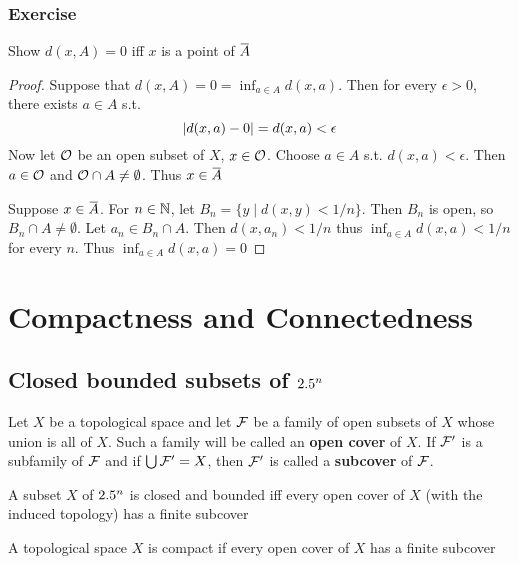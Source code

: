 \documentclass[11pt]{article}
\begin{document}
\subsubsection{Exercise}
\label{sec:org0058a10}
\begin{exercise}
\label{ex2.4.27}
Show \(d(x,A)=0\) iff \(x\) is a point of \(\bbar{A}\)
\end{exercise}

\begin{proof}
Suppose that \(d(x,A)=0=\inf_{a\in A}d(x,a)\). Then for every \(\epsilon>0\), there
exists \(a\in A\) s.t.
\begin{equation*}
\abs{d(x,a)-0}=d(x,a)<\epsilon
\end{equation*}
Now let \(\mathcal{O}\) be an open subset of \(X\), \(x\in\mathcal{O}\). Choose \(a\in
    A\) s.t. \(d(x,a)<\epsilon\). Then \(a\in\mathcal{O}\) and \(\mathcal{O}\cap
    A\neq\emptyset\). Thus \(x\in\bbar{A}\)

Suppose \(x\in\bbar{A}\). For \(n\in\mathbb{N}\), let \(B_n=\{y\mid d(x,y)<1/n\}\).
Then \(B_n\) is open, so \(B_n\cap A\neq\emptyset\). Let \(a_n\in B_n\cap
    A\). Then \(d(x,a_n)<1/n\) thus \(\inf_{a\in A}d(x,a)<1/n\) for every \(n\).
Thus \(\inf_{a\in A}d(x,a)=0\)
\end{proof}

\section{Compactness and Connectedness}
\label{sec:orge673780}

\subsection{Closed bounded subsets of \(2.5^n\)}
\label{sec:orgeaaeb49}
Let \(X\) be a topological space and let \(\mathcal{F}\) be a family of open
subsets of \(X\) whose union is all of \(X\). Such a family will be called an
\textbf{open cover} of \(X\). If \(\mathcal{F}'\) is a subfamily of \(\mathcal{F}\) and if
\(\bigcup\mathcal{F}'=X\), then \(\mathcal{F}'\) is called a \textbf{subcover} of \(\mathcal{F}\).

\begin{theorem}[]
\label{thm3.1}
A subset \(X\) of \(2.5^n\) is closed and bounded iff every open cover of
\(X\) (with the induced topology) has a finite subcover
\end{theorem}

\begin{definition}[]
A topological space \(X\) is compact if every open cover of \(X\) has a
finite subcover
\end{definition}
\end{document}
